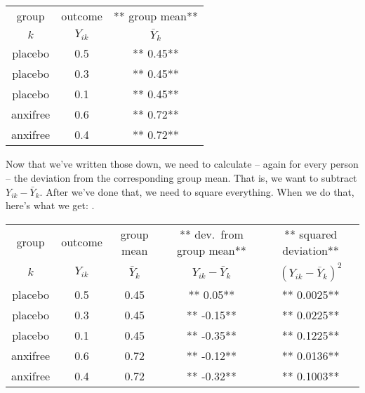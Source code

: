 \small
\vspace*{6pt}
\begin{tabular}{c|c|c} %
 group & outcome  & ** group mean** \\%
  $k$ &  $Y_{ik}$  & $\bar{Y}_k$ \\ \hline %
placebo  & 0.5  & ** 0.45** \\%
placebo  & 0.3 &  ** 0.45** \\%
placebo  &  0.1 &  ** 0.45** \\%
anxifree  & 0.6  & ** 0.72** \\%
anxifree  &  0.4 &  ** 0.72**\\%
\end{tabular}
\vspace*{6pt}
\normalsize


Now that we've written those down, we need to calculate -- again for every person -- the deviation from the corresponding group mean. That is, we want to subtract $Y_{ik} - \bar{Y}_k$. After we've done that, we need to square everything. When we do that, here's what we get:
. 

\small
\vspace*{6pt}
\begin{tabular}{c|c|c|c|c}
 group & outcome  & group mean & ** dev.\ from group mean** & ** squared deviation**\\  
  $k$ &  $Y_{ik}$  & $\bar{Y}_k$ & $Y_{ik} - \bar{Y}_{k}$ &  $(Y_{ik} - \bar{Y}_{k})^2$\\  \hline
placebo  & 0.5  & 0.45  & ** 0.05**  & ** 0.0025** \\
placebo  & 0.3 &  0.45 &  ** -0.15** & ** 0.0225**\\
placebo  &  0.1 &  0.45 &** -0.35**  & ** 0.1225** \\
anxifree  & 0.6  & 0.72  & ** -0.12**  & ** 0.0136** \\
anxifree  &  0.4 &  0.72 & ** -0.32** & ** 0.1003** \\ 
\end{tabular}
\vspace*{6pt}
\normalsize


